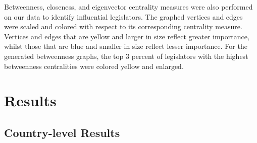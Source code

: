 \documentclass[12pt]{article}
\begin{document}
Betweenness, closeness, and eigenvector centrality measures were also performed on our data to identify influential legislators. The graphed vertices and edges were scaled and colored with respect to its corresponding centrality measure. Vertices and edges that are yellow and larger in size reflect greater importance, whilst those that are blue and smaller in size reflect lesser importance. For the generated betweenness graphs, the top 3 percent of legislators with the highest betweenness centralities were colored yellow and enlarged.


\section{Results}
\subsection{Country-level Results}
\end{document}
